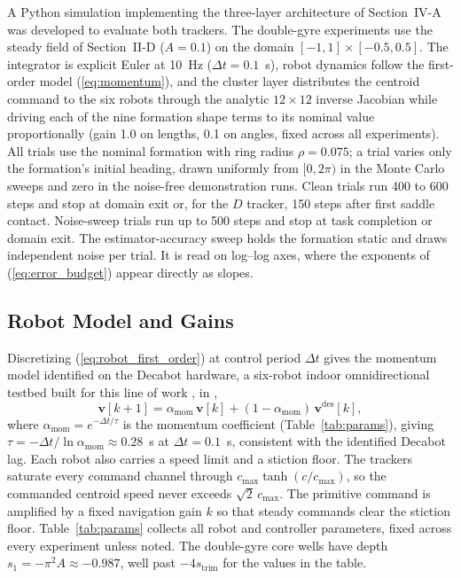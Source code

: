 \documentclass[lettersize,journal]{IEEEtran}
\begin{document}
A Python simulation implementing the three-layer architecture of
Section~\mbox{IV-A} was developed to evaluate both trackers.
The double-gyre experiments use the steady field of
Section~\mbox{II-D} ($A = 0.1$) on the domain $[-1, 1] \times
[-0.5, 0.5]$. The integrator is explicit Euler at 10~Hz ($\Delta t =
0.1$~s), robot dynamics follow the first-order model
(\ref{eq:momentum}), and the cluster layer distributes the centroid
command to the six robots through the analytic $12 \times 12$ inverse
Jacobian while driving each of the nine formation shape terms to its
nominal value proportionally (gain 1.0 on lengths, 0.1 on angles, fixed
across all experiments). All trials use the nominal formation with ring
radius $\rho = 0.075$; a trial varies only the formation's initial
heading, drawn uniformly from $[0, 2\pi)$ in the Monte Carlo sweeps and
zero in the noise-free demonstration runs. Clean trials run 400 to 600
steps and stop at domain exit or, for the $D$ tracker, 150 steps after
first saddle contact. Noise-sweep trials run up to 500 steps and stop
at task completion or domain exit. The estimator-accuracy sweep holds
the formation static and draws independent noise per trial. It is read
on log--log axes, where the exponents of (\ref{eq:error_budget}) appear
directly as slopes.

\subsection{Robot Model and Gains}
\label{sec:robot_model}

Discretizing (\ref{eq:robot_first_order}) at control period $\Delta t$
gives the momentum model identified on the Decabot hardware, a
six-robot indoor omnidirectional testbed built for this line of work
\cite{39,40}, in \cite{9},
\begin{equation}
    \mathbf{v}[k+1] = \alpha_{\text{mom}}\,\mathbf{v}[k]
    + (1 - \alpha_{\text{mom}})\,\mathbf{v}^{\text{des}}[k],
    \label{eq:momentum}
\end{equation}
where $\alpha_{\text{mom}} = e^{-\Delta t/\tau}$ is the momentum
coefficient (Table~\ref{tab:params}), giving $\tau = -\Delta
t/\ln\alpha_{\text{mom}} \approx 0.28$~s at $\Delta t = 0.1$~s,
consistent with the identified Decabot lag. Each robot also carries a
speed limit and a stiction floor.
The trackers saturate every command channel through
$c_{\max}\tanh(c/c_{\max})$, so the commanded centroid speed never
exceeds $\sqrt{2}\,c_{\max}$. The primitive command is amplified by a
fixed navigation gain $k$ so that steady commands clear the stiction
floor. Table~\ref{tab:params} collects all robot and controller
parameters, fixed across every experiment unless noted. The double-gyre
core wells have depth $s_1 = -\pi^2 A \approx -0.987$, well past
$-4s_{\mathrm{trim}}$ for the values in the table.
\end{document}
